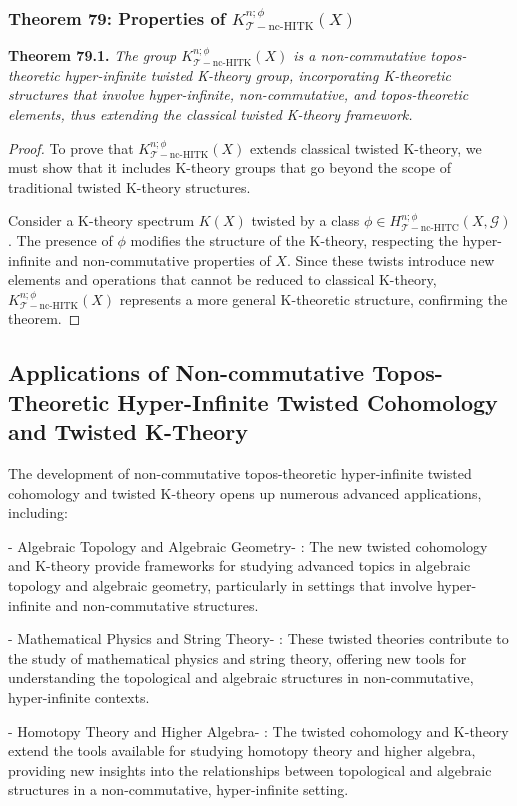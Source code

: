 \documentclass{article}
\begin{document}
\subsubsection{Theorem 79: Properties of \(K_{\mathcal{T}-\text{nc-HITK}}^{n; \phi}(X)\)}
\textbf{Theorem 79.1.} \textit{The group \(K_{\mathcal{T}-\text{nc-HITK}}^{n; \phi}(X)\) is a non-commutative topos-theoretic hyper-infinite twisted K-theory group, incorporating K-theoretic structures that involve hyper-infinite, non-commutative, and topos-theoretic elements, thus extending the classical twisted K-theory framework.}

\begin{proof}
To prove that \(K_{\mathcal{T}-\text{nc-HITK}}^{n; \phi}(X)\) extends classical twisted K-theory, we must show that it includes K-theory groups that go beyond the scope of traditional twisted K-theory structures.

Consider a K-theory spectrum \(K(X)\) twisted by a class \(\phi \in H_{\mathcal{T}-\text{nc-HITC}}^{n; \phi}(X, \mathcal{G})\). The presence of \(\phi\) modifies the structure of the K-theory, respecting the hyper-infinite and non-commutative properties of \(X\). Since these twists introduce new elements and operations that cannot be reduced to classical K-theory, \(K_{\mathcal{T}-\text{nc-HITK}}^{n; \phi}(X)\) represents a more general K-theoretic structure, confirming the theorem.
\end{proof}

\subsection{Applications of Non-commutative Topos-Theoretic Hyper-Infinite Twisted Cohomology and Twisted K-Theory}
The development of non-commutative topos-theoretic hyper-infinite twisted cohomology and twisted K-theory opens up numerous advanced applications, including:

-  Algebraic Topology and Algebraic Geometry- : The new twisted cohomology and K-theory provide frameworks for studying advanced topics in algebraic topology and algebraic geometry, particularly in settings that involve hyper-infinite and non-commutative structures.

-  Mathematical Physics and String Theory- : These twisted theories contribute to the study of mathematical physics and string theory, offering new tools for understanding the topological and algebraic structures in non-commutative, hyper-infinite contexts.

-  Homotopy Theory and Higher Algebra- : The twisted cohomology and K-theory extend the tools available for studying homotopy theory and higher algebra, providing new insights into the relationships between topological and algebraic structures in a non-commutative, hyper-infinite setting.
\end{document}
